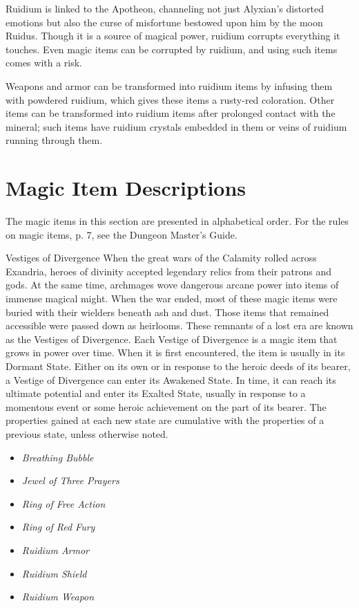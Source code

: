 \documentclass[letterpaper, 11pt, bg=full, twocolumn]{dndbook}
\begin{document}
Ruidium is linked to the Apotheon, channeling not just Alyxian's distorted emotions but also the curse of misfortune bestowed upon him by the moon Ruidus. Though it is a source of magical power, ruidium corrupts everything it touches. Even magic items can be corrupted by ruidium, and using such items comes with a risk.

Weapons and armor can be transformed into ruidium items by infusing them with powdered ruidium, which gives these items a rusty-red coloration. Other items can be transformed into ruidium items after prolonged contact with the mineral; such items have ruidium crystals embedded in them or veins of ruidium running through them.
\section{Magic Item Descriptions}

The magic items in this section are presented in alphabetical order. For the rules on magic items, p. 7, see the Dungeon Master's Guide.

\begin{DndSidebar}{Vestiges of Divergence}
When the great wars of the Calamity rolled across Exandria, heroes of divinity accepted legendary relics from their patrons and gods. At the same time, archmages wove dangerous arcane power into items of immense magical might. When the war ended, most of these magic items were buried with their wielders beneath ash and dust. Those items that remained accessible were passed down as heirlooms. These remnants of a lost era are known as the Vestiges of Divergence.
Each Vestige of Divergence is a magic item that grows in power over time. When it is first encountered, the item is usually in its Dormant State. Either on its own or in response to the heroic deeds of its bearer, a Vestige of Divergence can enter its Awakened State. In time, it can reach its ultimate potential and enter its Exalted State, usually in response to a momentous event or some heroic achievement on the part of its bearer. The properties gained at each new state are cumulative with the properties of a previous state, unless otherwise noted.
\end{DndSidebar}

\begin{itemize}
\item \textit{Breathing Bubble}
\item \textit{Jewel of Three Prayers}
\item \textit{Ring of Free Action}
\item \textit{Ring of Red Fury}
\item \textit{Ruidium Armor}
\item \textit{Ruidium Shield}
\item \textit{Ruidium Weapon}
\end{itemize}
\end{document}
